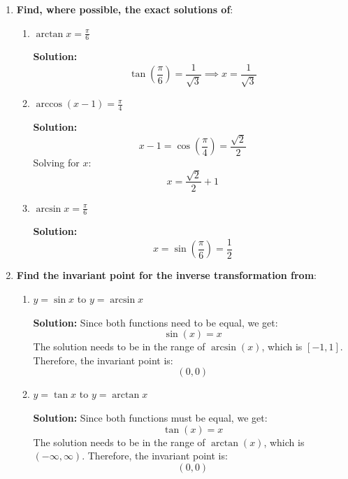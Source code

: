 \documentclass{article}
\begin{document}
\begin{enumerate}

    \item \textbf{Find, where possible, the exact solutions of}:
          \begin{enumerate}
              \item \(\arctan x = \frac{\pi}{6}\)

                    \textbf{Solution:}
                    \[
                        \tan\left(\frac{\pi}{6}\right) = \frac{1}{\sqrt{3}} \implies x = \frac{1}{\sqrt{3}}
                    \]

              \item \(\arccos(x - 1) = \frac{\pi}{4}\)

                    \textbf{Solution:}
                    \[
                        x - 1 = \cos\left(\frac{\pi}{4}\right) = \frac{\sqrt{2}}{2}
                    \]
                    Solving for \(x\):
                    \[
                        x = \frac{\sqrt{2}}{2} + 1
                    \]

              \item \(\arcsin x = \frac{\pi}{6}\)

                    \textbf{Solution:}
                    \[
                        x = \sin\left(\frac{\pi}{6}\right) = \frac{1}{2}
                    \]
          \end{enumerate}

    \item \textbf{Find the invariant point for the inverse transformation from}:
          \begin{enumerate}
              \item \(y = \sin x \) to \(y = \arcsin x\)

                    \textbf{Solution:}
                    Since both functions need to be equal, we get:
                    \[
                        \sin(x) = x
                    \]
                    The solution needs to be in the range of \(\arcsin(x)\), which is \([-1, 1]\). Therefore, the invariant point is:
                    \[
                        (0, 0)
                    \]

              \item \(y = \tan x \) to \(y = \arctan x\)

                    \textbf{Solution:}
                    Since both functions must be equal, we get:
                    \[
                        \tan(x) = x
                    \]
                    The solution needs to be in the range of \(\arctan(x)\), which is \((-\infty, \infty)\). Therefore, the invariant point is:
                    \[
                        (0, 0)
                    \]
          \end{enumerate}
\end{enumerate}
\end{document}
